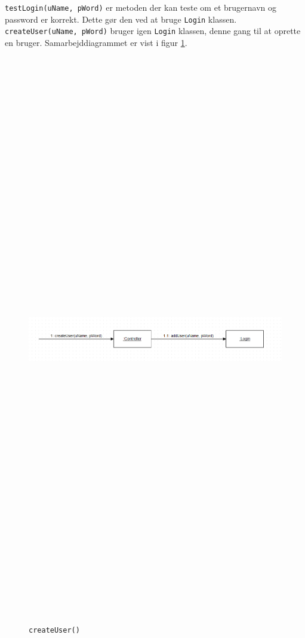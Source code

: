\newline
\texttt{testLogin(uName, pWord)} er metoden der kan teste om et brugernavn og password er korrekt. Dette gør den ved at bruge \texttt{Login} klassen.
\newline
\texttt{createUser(uName, pWord)} bruger igen \texttt{Login} klassen, denne gang til at oprette en bruger. Samarbejddiagrammet er vist i figur \ref{fig:createu}.
\begin{figure}[ht]
	\centering
	\includegraphics[width=15cm,height=25cm,keepaspectratio]{pictures/SDcreateUser.png}
	\caption{\texttt{createUser()}}
	\label{fig:createu}
\end{figure}
\hfill \break

